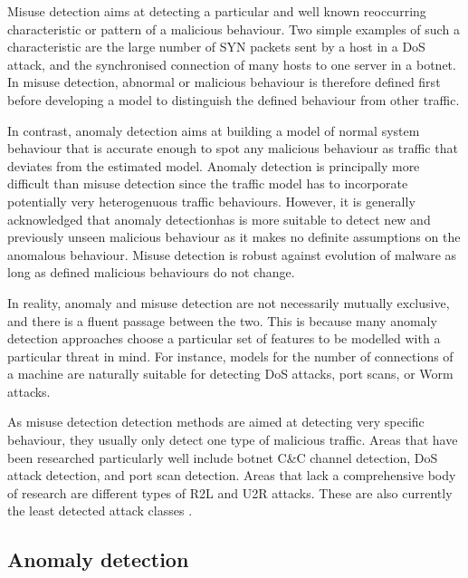 Misuse detection aims at detecting a particular and well known reoccurring characteristic or pattern of a malicious behaviour. Two simple examples of such a characteristic are the large number of SYN packets sent by a host in a DoS attack, and the synchronised connection of many hosts to one server in a botnet. In misuse detection, abnormal or malicious behaviour is therefore defined first before developing a model to distinguish the defined behaviour from other traffic.

In contrast, anomaly detection aims at building a model of normal system behaviour that is accurate enough to spot any malicious behaviour as traffic that deviates from the estimated model. Anomaly detection is principally more difficult than misuse detection since the traffic model has to incorporate potentially very heterogenuous traffic behaviours. However, it is generally acknowledged that anomaly detectionhas is more suitable to detect new and previously unseen malicious behaviour as it makes no definite assumptions on the anomalous behaviour. Misuse detection is robust against evolution of malware as long as defined malicious behaviours do not change.

In reality, anomaly and misuse detection are not necessarily mutually exclusive, and there is a fluent passage between the two. This is because many anomaly detection approaches choose a particular set of features to be modelled with a particular threat in mind. For instance, models for the number of connections of a machine are naturally suitable for detecting DoS attacks, port scans, or Worm attacks. 

As misuse detection detection methods are aimed at detecting very specific behaviour, they usually only detect one type of malicious traffic. Areas that have been researched particularly well include botnet C\&C channel detection, DoS attack detection, and port scan detection. Areas that lack a comprehensive body of research are different types of R2L and U2R attacks. These are also currently the least   detected   attack   classes \cite{nisioti2018intrusion}.

\subsection{Anomaly detection}

